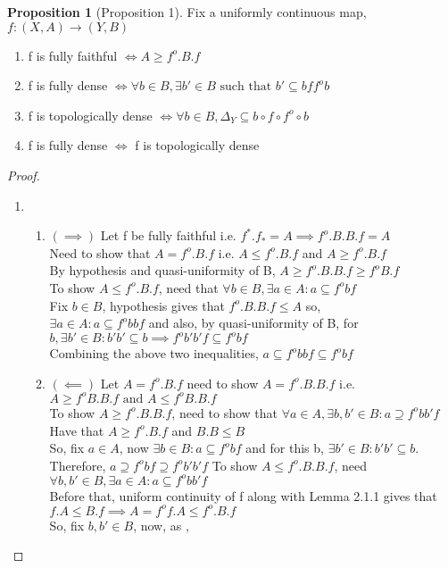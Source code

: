 \documentclass[18pt,a4paper]{article}
\theoremstyle{definition}
\newtheorem{proop}{Proposition}[section]
\begin{document}
		\begin{proop}[Proposition 1]
			Fix a uniformly continuous map, $f:(X,A) \rightarrow (Y,B)$
			\begin{enumerate}[label=(\alph*)]
				\item f is fully faithful $\iff A\geq f^o.B.f$
				\item f is fully dense $\iff \forall b\in B, \exists b' \in B \text{ such that }
					b' \subseteq bff^o b$
				\item f is topologically dense $\iff\forall b\in B,\Delta_Y\subseteq b\circ f\circ f^o\circ b$
				\item f is fully dense $\iff$ f is topologically dense
			\end{enumerate}
		\end{proop}
		\begin{proof}
		\item
			\begin{enumerate}[label=(\alph*)]
				\item \begin{enumerate}[label=(\roman*)]
					\item $ (\implies) $ Let f be fully faithful i.e. $f^*.f_*=A
						\implies f^o .B.B.f=A $\\
						Need to show that $A= f^o .B.f$ i.e.
						$A\leq f^o .B.f$ and  $A\geq f^o .B.f$\\
						By hypothesis and quasi-uniformity of B,
						$A\geq f^o .B.B.f \geq f^o B.f $\\
						To show $A \leq f^o .B.f$, need that $\forall b \in B, \exists a
						\in A : a \subseteq f^o bf$\\
						Fix $b\in B$, hypothesis gives that $f^o .B.B.f \leq A$ so, \\
						$\exists a \in A: a \subseteq f^o bbf$ and also, by
						quasi-uniformity of B, for $b, \exists b' \in B : b'b' \subseteq b
						\implies f^o b'b'f \subseteq f^o bf$\\
						Combining the above two inequalities,
						$a \subseteq f^o bbf \subseteq f^o bf$\\
					\item $(\impliedby)$ Let $A=f^o .B.f$ need to show $A=f^o.B.B.f$ i.e.
						$A\geq f^o B.B.f \text{ and } A\leq f^o B.B.f$\\
						To show $A\geq f^o .B.B.f$, need to show that $\forall a\in A,
						\exists b,b' \in B : a \supseteq f^o bb'f$\\
						Have that $A\geq f^o .B.f$ and $B.B \leq B$\\
						So, fix $a \in A$, now $\exists b\in B: a \subseteq f^o bf$
						and for this b, $\exists b'\in B: b'b' \subseteq b$.
						Therefore, $a \supseteq f^o bf \supseteq f^o b'b' f$
						To show $A\leq f^o .B.B.f$, need $\forall b,b'\in B, \exists
						a\in A : a \subseteq f^o bb'f$ \\
						Before that, uniform continuity
						of f along with Lemma 2.1.1 gives that \\$f.A\leq B.f
						\implies A=f^o f.A \leq f^o.B.f$ \\
						So, fix $b,b' \in B $, now, as ,


\end{enumerate}
\end{enumerate}
\end{proof}
\end{document}
